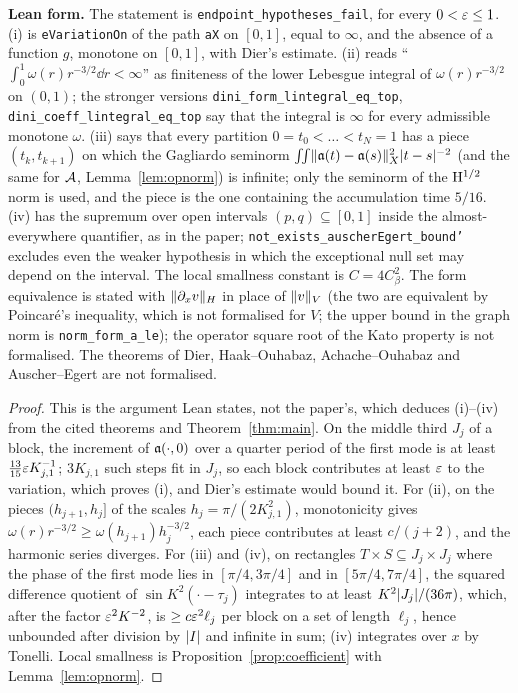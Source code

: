 \textbf{Lean form.}  The statement is \texttt{endpoint\_hypotheses\_fail}, for every
$0<\varepsilon\leq1$.  (i) is \texttt{eVariationOn} of the path \texttt{aX} on $[0,1]$, equal to
$\infty$, and the absence of a function $g$, monotone on $[0,1]$, with Dier's estimate.  (ii)
reads ``$\int_0^1\omega(r)r^{-3/2}\dd r<\infty$'' as finiteness of the lower Lebesgue integral of
$\omega(r)r^{-3/2}$ on $(0,1)$; the stronger versions
\texttt{dini\_form\_lintegral\_eq\_top}, \texttt{dini\_coeff\_lintegral\_eq\_top} say that the
integral is $\infty$ for every admissible monotone $\omega$.  (iii) says that every partition
$0=t_0<\dots<t_N=1$ has a piece $(t_k,t_{k+1})$ on which the Gagliardo seminorm
$\iint\lVert \mathfrak{a}(t)-\mathfrak{a}(s)\rVert_X^2\lvert t-s\rvert^{-2}$ (and the same for $\mathcal{A}$, Lemma~\ref{lem:opnorm}) is
infinite; only the seminorm of the $\mathrm{H}^{1/2}$ norm is used, and the piece is the one containing
the accumulation time $5/16$.  (iv) has the supremum over open intervals $(p,q)\subseteq[0,1]$
inside the almost-everywhere quantifier, as in the paper; \texttt{not\_exists\_auscherEgert\_bound'}
excludes even the weaker hypothesis in which the exceptional null set may depend on the interval.  The local smallness constant is
$C=4C_\beta^2$.  The form equivalence is stated with $\lVert \partial_xv\rVert_H$ in place of
$\lVert v\rVert_V$ (the two are equivalent by Poincar\'e's inequality, which is not formalised for
$V$; the upper bound in the graph norm is \texttt{norm\_form\_a\_le}); the operator square root of
the Kato property is not formalised.  The theorems of Dier, Haak--Ouhabaz, Achache--Ouhabaz and
Auscher--Egert are not formalised.

\begin{proof}
  \leanok
  This is the argument Lean states, not the paper's, which deduces (i)--(iv) from the cited
  theorems and Theorem~\ref{thm:main}.  On the middle third $J_j$ of a block, the increment of
  $\mathfrak{a}(\cdot,0)$ over a quarter period of the first mode is at least $\frac{13}{15}\varepsilon K_{j,1}^{-1}$;
  $3K_{j,1}$ such steps fit in $J_j$, so each block contributes at least $\varepsilon$ to the variation,
  which proves (i), and Dier's estimate would bound it.  For (ii), on the pieces
  $(h_{j+1},h_j]$ of the scales $h_j=\pi/(2K_{j,1}^2)$, monotonicity gives
  $\omega(r)r^{-3/2}\geq\omega(h_{j+1})h_j^{-3/2}$, each piece contributes at least $c/(j+2)$, and the
  harmonic series diverges.  For (iii) and (iv), on rectangles $T\times S\subseteq J_j\times J_j$
  where the phase of the first mode lies in $[\pi/4,3\pi/4]$ and in $[5\pi/4,7\pi/4]$, the
  squared difference quotient of $\sin K^2(\cdot-\tau_j)$ integrates to at least
  $K^2\lvert J_j\rvert/(36\pi)$, which, after the factor $\varepsilon^2K^{-2}$, is $\geq c\varepsilon^2\ell_j$ per block
  on a set of length $\ell_j$, hence unbounded after division by $\lvert I\rvert$ and infinite in sum; (iv)
  integrates over $x$ by Tonelli.  Local smallness is
  Proposition~\ref{prop:coefficient} with Lemma~\ref{lem:opnorm}.
\end{proof}
